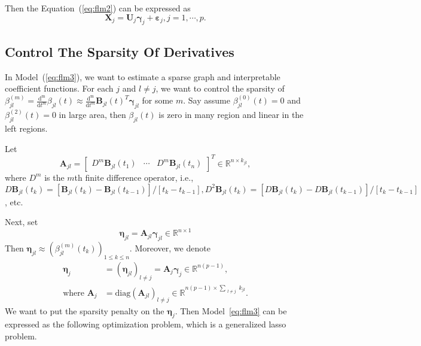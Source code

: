\documentclass[11pt]{article}
\newcommand{\R}{\mathbb R}
\newcommand{\bX}{\mathbf X}
\newcommand{\bA}{\mathbf A}
\newcommand{\bB}{\mathbf B}
\newcommand{\bU}{\mathbf U}
\newcommand{\bseta}{\boldsymbol{\eta}}
\newcommand{\bvarepsilon}{\boldsymbol{\varepsilon}}
\newcommand{\bgamma}{\boldsymbol{\gamma}}
\begin{document}
Then the Equation~(\ref{eq:flm2}) can be expressed as
\begin{equation}
	\label{eq:flm3}
	\bX_j = \bU_j \bgamma_j + \bvarepsilon_j, j = 1, \cdots, p.
\end{equation}
 
\subsection{Control The Sparsity Of Derivatives}

In Model~(\ref{eq:flm3}), we want to estimate a sparse graph and interpretable coefficient functions. For each $j$ and $l \neq j$, we want to control the sparsity of $ \beta_{jl}^{(m)} = \frac{\mathrm{d^m}}{\mathrm{d} t^m} \beta_{jl}(t) \approx \frac{\mathrm{d^m}}{\mathrm{d} t^m} \bB_{jl}(t)^T \bgamma_{jl}$ for some $m$. Say assume $\beta_{jl}^{(0)}(t) = 0$ and $\beta_{jl}^{(2)}(t) = 0$ in large area, then $\beta_{jl}(t)$ is zero in many region and linear in the left regions.

Let 
\begin{equation}
	\bA_{jl} = \begin{bmatrix} D^m\bB_{jl}(t_1) & \cdots & D^m\bB_{jl}(t_n) \end{bmatrix}^T \in \R^{n \times k_{jl}},
\end{equation} 
where $D^m$ is the $m$th finite difference operator, i.e., $D\bB_{jl}(t_k) = [\bB_{jl}(t_k) - \bB_{jl}(t_{k-1})]/[t_k - t_{k-1}], D^2\bB_{jl}(t_k) = [D\bB_{jl}(t_k) - D\bB_{jl}(t_{k-1})]/[t_k - t_{k-1}]$, etc. 

Next, set
\begin{equation}
	\bseta_{jl} = \bA_{jl} \bgamma_{jl} \in \R^{n \times 1}  
\end{equation}
Then $\bseta_{jl} \approx (\beta_{jl}^{(m)}(t_k))_{1 \leq k \leq n}$. Moreover, we denote 
\begin{equation}
	\begin{aligned}
	\bseta_j &= (\bseta_{jl})_{l \neq j} = \bA_j \bgamma_j \in \R^{n(p-1)},\\
    \text{where }\bA_j&= \text{diag}(\bA_{jl})_{l \neq j} \in \R^{n(p-1)  \times \sum_{\substack{l \neq j}} k_{jl} }.
	\end{aligned}
\end{equation}
We want to put the sparsity penalty on the $\bseta_j$. Then Model~\ref{eq:flm3} can be expressed as the following optimization problem, which is a generalized lasso problem. 
\end{document}
